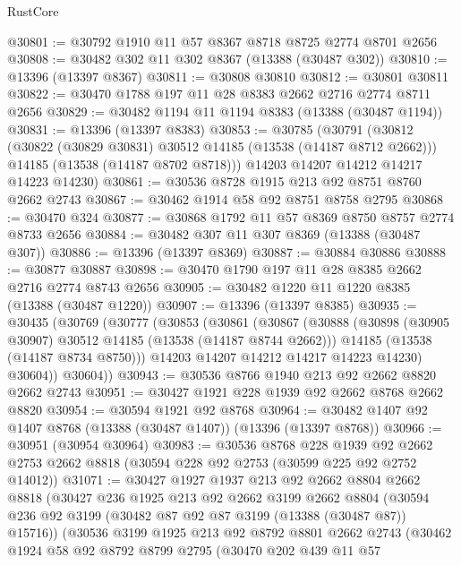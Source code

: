 \begin{lexlean}{RustCore}
\begin{coremodule}
@30801 := @30792 @1910 @11 @57 @8367 @8718 @8725 @2774 @8701 @2656
@30808 := @30482 @302 @11 @302 @8367 (@13388 (@30487 @302))
@30810 := @13396 (@13397 @8367)
@30811 := @30808 @30810
@30812 := @30801 @30811
@30822 := @30470 @1788 @197 @11 @28 @8383 @2662 @2716 @2774 @8711 @2656
@30829 := @30482 @1194 @11 @1194 @8383 (@13388 (@30487 @1194))
@30831 := @13396 (@13397 @8383)
@30853 := @30785
    (@30791
      (@30812
        (@30822 (@30829 @30831) @30512 @14185 (@13538 (@14187 @8712 @2662)))
        @14185
        (@13538 (@14187 @8702 @8718)))
      @14203
      @14207
      @14212
      @14217
      @14223
      @14230)
@30861 := @30536 @8728 @1915 @213 @92 @8751 @8760 @2662 @2743
@30867 := @30462 @1914 @58 @92 @8751 @8758 @2795
@30868 := @30470 @324
@30877 := @30868 @1792 @11 @57 @8369 @8750 @8757 @2774 @8733 @2656
@30884 := @30482 @307 @11 @307 @8369 (@13388 (@30487 @307))
@30886 := @13396 (@13397 @8369)
@30887 := @30884 @30886
@30888 := @30877 @30887
@30898 := @30470 @1790 @197 @11 @28 @8385 @2662 @2716 @2774 @8743 @2656
@30905 := @30482 @1220 @11 @1220 @8385 (@13388 (@30487 @1220))
@30907 := @13396 (@13397 @8385)
@30935 := @30435
    (@30769
      (@30777
        (@30853
          (@30861
            (@30867
              (@30888
                (@30898 (@30905 @30907) @30512 @14185 (@13538 (@14187 @8744 @2662)))
                @14185
                (@13538 (@14187 @8734 @8750)))
              @14203
              @14207
              @14212
              @14217
              @14223
              @14230)
            @30604))
        @30604))
@30943 := @30536 @8766 @1940 @213 @92 @2662 @8820 @2662 @2743
@30951 := @30427 @1921 @228 @1939 @92 @2662 @8768 @2662 @8820
@30954 := @30594 @1921 @92 @8768
@30964 := @30482 @1407 @92 @1407 @8768 (@13388 (@30487 @1407)) (@13396 (@13397 @8768))
@30966 := @30951 (@30954 @30964)
@30983 := @30536
    @8768
    @228
    @1939
    @92
    @2662
    @2753
    @2662
    @8818
    (@30594 @228 @92 @2753 (@30599 @225 @92 @2752 @14012))
@31071 := @30427
    @1927
    @1937
    @213
    @92
    @2662
    @8804
    @2662
    @8818
    (@30427
      @236
      @1925
      @213
      @92
      @2662
      @3199
      @2662
      @8804
      (@30594 @236 @92 @3199 (@30482 @87 @92 @87 @3199 (@13388 (@30487 @87)) @15716))
      (@30536
        @3199
        @1925
        @213
        @92
        @8792
        @8801
        @2662
        @2743
        (@30462
          @1924
          @58
          @92
          @8792
          @8799
          @2795
          (@30470
            @202
            @439
            @11
            @57

\end{coremodule}
\end{lexlean}
